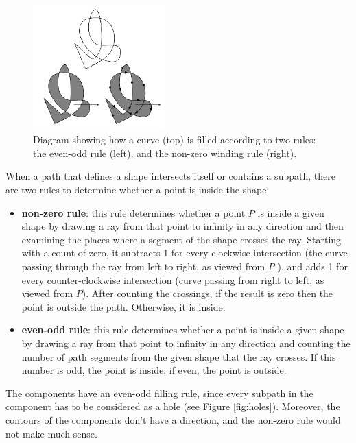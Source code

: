 \documentclass[]{usiinfbachelorproject}
\begin{document}
\begin{figure}
	\centering
	\includegraphics[width=0.45\textwidth]{img/fillrule.png}
	\caption{Diagram showing how a curve (top) is filled according to two rules: the even-odd rule (left), and the non-zero winding rule (right).}
	\label{fig:fillrule}
\end{figure}

\noindent When a path that defines a shape intersects itself or contains a subpath, there are two rules to determine whether a point is inside the shape:
\begin{itemize}
	\item {\bf non-zero rule}: this rule determines whether a point $P$ is inside a given shape by drawing a ray from that point to infinity in any direction and then examining the places where a segment of the shape crosses the ray. Starting with a count of zero, it subtracts 1 for every clockwise intersection (the curve passing through the ray from left to right, as viewed from $P$ ), and adds 1 for every counter-clockwise intersection (curve passing from right to left, as viewed from $P$). After counting the crossings, if the result is zero then the point is outside the path. Otherwise, it is inside.
	\item {\bf even-odd rule}: this rule determines whether a point is inside a given shape by drawing a ray from that point to infinity in any direction and counting the number of path segments from the given shape that the ray crosses. If this number is odd, the point is inside; if even, the point is outside.
\end{itemize}

\noindent The components have an even-odd filling rule, since every subpath in the component has to be considered as a hole (see Figure \ref{fig:holes}). Moreover, the contours of the components don't have a direction, and the non-zero rule would not make much sense.
\end{document}
